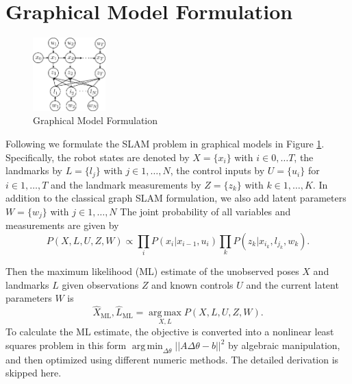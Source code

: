 \section{Graphical Model Formulation}
\begin{figure}
\begin{center}
 \includegraphics[width=0.25\textwidth]{fig/model} 
\end{center}
\caption{Graphical Model Formulation}
\label{fig:model}
\end{figure}

Following \cite{isam} we formulate the SLAM problem in graphical models in Figure \ref{fig:model}. Specifically, the robot states are denoted by $X = \{x_i\}$ with $i \in 0, \dots T$, the landmarks by $L = \{l_j\}$ with $j \in 1,\dots, N$, the control inputs by $U = \{u_i\}$ for $i \in 1,\dots, T$ and the landmark measurements by $Z = \{z_k\}$ with $k \in 1, \dots, K$. In addition to the classical graph SLAM formulation, we also add latent parameters $W = \{w_j\}$ with $j \in 1, \dots, N$  The joint probability of all variables and measurements are given by
\begin{equation}
P(X, L, U, Z, W) \propto \prod\limits_{i}P(x_i|x_{i-1}, u_i)\prod\limits_{k}P(z_k|x_{i_k}, l_{j_k}, w_k).
\label{eq:jointProb}
\end{equation}

Then the maximum likelihood (ML) estimate of the unobserved poses $X$ and landmarks $L$ given observations $Z$ and known controls $U$ and the current latent parameters $W$ is
\begin{equation}
\hat{X}_{\mathrm{ML}}, \hat{L}_{\mathrm{ML}} = \operatorname*{arg\,max}_{X,L} P(X,L,U,Z,W).
\end{equation}
To calculate the ML estimate, the objective is converted into a nonlinear least
squares problem in this form $\operatorname*{arg\,min}_{\Delta \theta} || A
\Delta \theta  - b ||^2$ by algebraic manipulation, and then optimized using
different numeric methods. The detailed derivation is skipped here.

